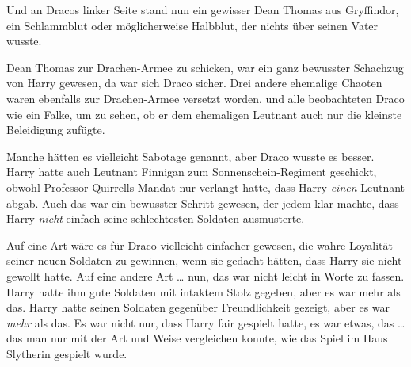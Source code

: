 Und an Dracos linker Seite stand nun ein gewisser Dean Thomas aus Gryffindor, ein Schlammblut oder möglicherweise Halbblut, der nichts über seinen Vater wusste.

Dean Thomas zur Drachen-Armee zu schicken, war ein ganz bewusster Schachzug von Harry gewesen, da war sich Draco sicher. Drei andere ehemalige Chaoten waren ebenfalls zur Drachen-Armee versetzt worden, und alle beobachteten Draco wie ein Falke, um zu sehen, ob er dem ehemaligen Leutnant auch nur die kleinste Beleidigung zufügte.

Manche hätten es vielleicht Sabotage genannt, aber Draco wusste es besser. Harry hatte auch Leutnant Finnigan zum Sonnenschein-Regiment geschickt, obwohl Professor Quirrells Mandat nur verlangt hatte, dass Harry \emph{einen} Leutnant abgab. Auch das war ein bewusster Schritt gewesen, der jedem klar machte, dass Harry \emph{nicht} einfach seine schlechtesten Soldaten ausmusterte.

Auf eine Art wäre es für Draco vielleicht einfacher gewesen, die wahre Loyalität seiner neuen Soldaten zu gewinnen, wenn sie gedacht hätten, dass Harry sie nicht gewollt hatte. Auf eine andere Art … nun, das war nicht leicht in Worte zu fassen. Harry hatte ihm gute Soldaten mit intaktem Stolz gegeben, aber es war mehr als das. Harry hatte seinen Soldaten gegenüber Freundlichkeit gezeigt, aber es war \emph{mehr} als das. Es war nicht nur, dass Harry fair gespielt hatte, es war etwas, das … das man nur mit der Art und Weise vergleichen konnte, wie das Spiel im Haus Slytherin gespielt wurde.

